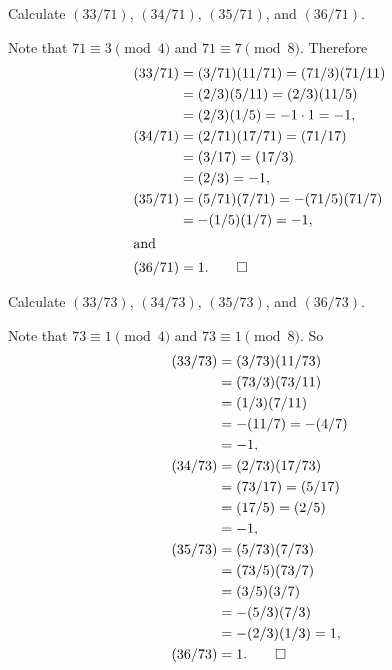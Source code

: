  Calculate $(33/71)$, $(34/71)$, $(35/71)$, and $(36/71)$.
\begin{solution}
  Note that $71\equiv3\pmod4$ and $71\equiv7\pmod8$. Therefore
  \begin{align*}
    (33/71) &= (3/71)(11/71)
              = (71/3)(71/11) \\
            &= (2/3)(5/11)
              = (2/3)(11/5) \\
            &= (2/3)(1/5)
              = -1\cdot1 = -1, \\
    (34/71) &= (2/71)(17/71)
              = (71/17) \\
            &= (3/17)
              = (17/3) \\
            &= (2/3)
              = -1, \\
    (35/71) &= (5/71)(7/71)
              = -(71/5)(71/7) \\
            &= -(1/5)(1/7)
              = -1, \\
    \intertext{and}
    (36/71) &= 1. \qedhere
  \end{align*}
\end{solution}

 Calculate $(33/73)$, $(34/73)$, $(35/73)$, and $(36/73)$.
\begin{solution}
  Note that $73\equiv1\pmod4$ and $73\equiv1\pmod8$. So
  \begin{align*}
    (33/73) &= (3/73)(11/73) \\
            &= (73/3)(73/11) \\
            &= (1/3)(7/11) \\
            &= -(11/7) = -(4/7) \\
            &= -1, \\
    (34/73) &= (2/73)(17/73) \\
            &= (73/17) = (5/17) \\
            &= (17/5) = (2/5) \\
            &= -1, \\
    (35/73) &= (5/73)(7/73) \\
            &= (73/5)(73/7) \\
            &= (3/5)(3/7) \\
            &= -(5/3)(7/3) \\
            &= -(2/3)(1/3)
              = 1, \\
    (36/73) &= 1. \qedhere
  \end{align*}
\end{solution}

